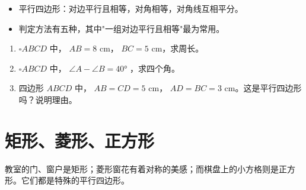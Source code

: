 \begin{keytakeaway}


\begin{itemize}
  \item 平行四边形：对边平行且相等，对角相等，对角线互相平分。
  \item 判定方法有五种，其中"一组对边平行且相等"最为常用。
\end{itemize}


\end{keytakeaway}

\begin{practice}


\begin{enumerate}
  \item $\square ABCD$ 中， $AB = 8$ cm， $BC = 5$ cm，求周长。
  \item $\square ABCD$ 中， $\angle A - \angle B = 40°$ ，求四个角。
  \item 四边形 $ABCD$ 中， $AB = CD = 5$ cm， $AD = BC = 3$ cm。这是平行四边形吗？说明理由。
\end{enumerate}


\end{practice}



\section*{矩形、菱形、正方形}


\begin{explore}


教室的门、窗户是矩形；菱形窗花有着对称的美感；而棋盘上的小方格则是正方形。它们都是特殊的平行四边形。

\end{explore}


